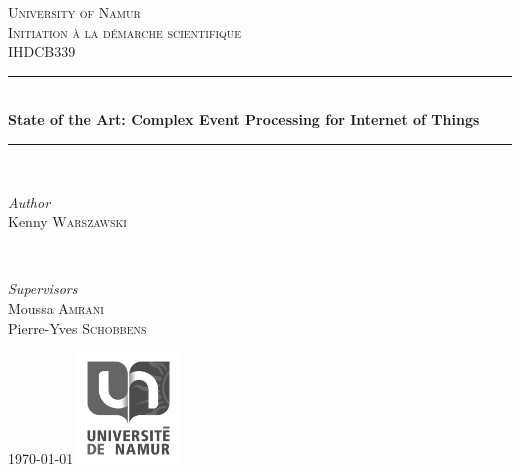 \documentclass[11pt]{article}
\begin{document}
\begin{titlepage}
	\newcommand{\HRule}{\rule{\linewidth}{0.5mm}}
	\center
	\textsc{\LARGE University of Namur}\\[1.5cm]
	\textsc{\Large Initiation à la démarche scientifique}\\[0.5cm]
	\textsc{\large IHDCB339}\\[0.5cm]
	\HRule\\[0.4cm]
	{\huge\bfseries State of the Art: Complex Event Processing for Internet of Things}\\[0.4cm]
	\HRule\\[1.5cm]	
	\begin{minipage}{0.4\textwidth}
		\begin{flushleft}
			\large
			\textit{Author}\\
			Kenny \textsc{Warszawski} 
		\end{flushleft}
	\end{minipage}
	~
	\begin{minipage}{0.4\textwidth}
		\begin{flushright}
			\large
			\textit{Supervisors}\\
			Moussa \textsc{Amrani}
			\\
			Pierre-Yves \textsc{Schobbens} 
		\end{flushright}
	\end{minipage}	
	\vfill\vfill\vfill
	{\large\today}
	\vfill\vfill
	\includegraphics[width=0.2\textwidth]{placeholder.png}\\[1cm]
	\vfill
\end{titlepage}
\end{document}
